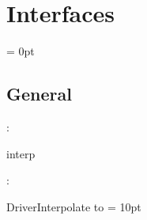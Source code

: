 
\section{Interfaces} 


\parskip = 0pt

\vspace{3mm} \subsection*{General}

: 

interp
\vspace{2mm}

\vspace{5mm}

: 



DriverInterpolate to 
\vspace{2mm}\parskip = 10pt 
